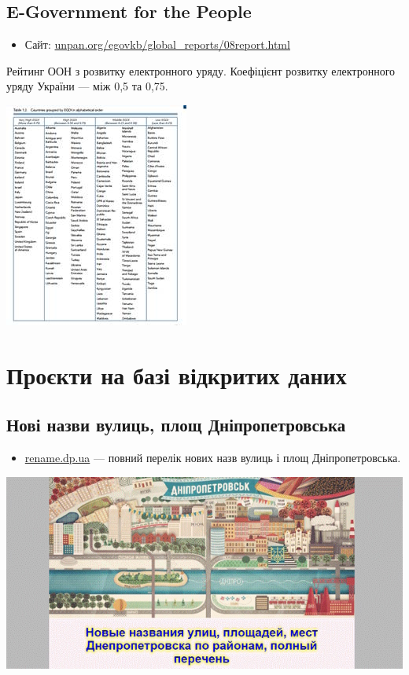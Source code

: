 \subsection{E-Government for the People}

\begin{itemize}
    \item Сайт: \href{http://www.unpan.org/egovkb/global_reports/08report.html}{unpan.org/egovkb/global_reports/08report.html}
\end{itemize}

Рейтинг ООН з розвитку електронного уряду. Коефіцієнт розвитку електронного уряду України — між 0,5 та 0,75.

\includegraphics{images/016.jpg}

\section{Проєкти на базі відкритих даних}

\subsection{Нові назви вулиць, площ Дніпропетровська}

\begin{itemize}
    \item \href{http://rename.dp.ua/}{rename.dp.ua} — повний перелік нових назв вулиць і площ Дніпропетровська.
\end{itemize}

\includegraphics{images/017.jpg}

